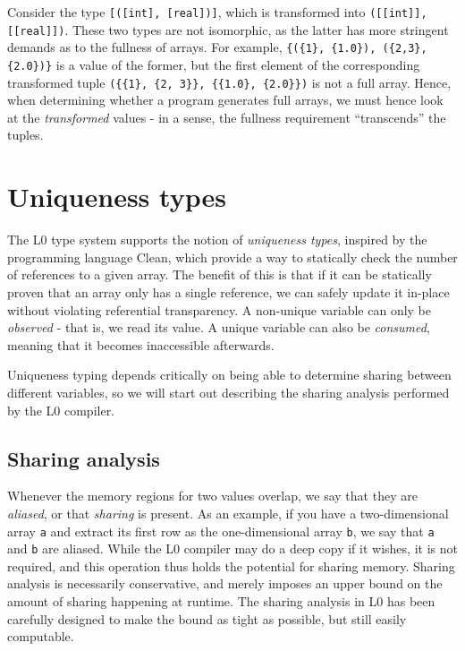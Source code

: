 \documentclass[oneside]{memoir}
\begin{document}
Consider the type \texttt{[([int], [real])]}, which is transformed
into \texttt{([[int]], [[real]])}.  These two types are not
isomorphic, as the latter has more stringent demands as to the
fullness of arrays.  For example, \texttt{\{(\{1\}, \{1.0\}), (\{2,3\},
    \{2.0\})\}} is a value of the former, but the first element of
the corresponding transformed tuple 
\texttt{(\{\{1\}, \{2, 3\}\}, \{\{1.0\}, \{2.0\}\})} is not a
full array.  Hence, when determining whether a program generates full
arrays, we must hence look at the \textit{transformed} values - in a
sense, the fullness requirement ``transcends'' the tuples.

\section{Uniqueness types}
\label{sec:l0-uniqueness-types}

The L0 type system supports the notion of \emph{uniqueness types},
inspired by the programming language Clean, which provide a way to
statically check the number of references to a given array.  The
benefit of this is that if it can be statically proven that an array
only has a single reference, we can safely update it in-place without
violating referential transparency.  A non-unique variable can only be
\textit{observed} - that is, we read its value.  A unique variable can
also be \textit{consumed}, meaning that it becomes inaccessible
afterwards.

Uniqueness typing depends critically on being able to determine
sharing between different variables, so we will start out describing
the sharing analysis performed by the L0 compiler.

\subsection{Sharing analysis}
\label{subsec:l0-sharing}

Whenever the memory regions for two values overlap, we say that they
are \textit{aliased}, or that \textit{sharing} is present.  As an
example, if you have a two-dimensional array \texttt{a} and extract
its first row as the one-dimensional array \texttt{b}, we say that
\texttt{a} and \texttt{b} are aliased.  While the L0 compiler may do a
deep copy if it wishes, it is not required, and this operation thus
holds the potential for sharing memory.  Sharing analysis is
necessarily conservative, and merely imposes an upper bound on the
amount of sharing happening at runtime.  The sharing analysis in L0
has been carefully designed to make the bound as tight as possible,
but still easily computable.
\end{document}
